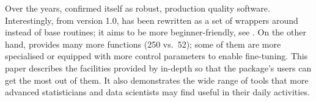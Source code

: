 \documentclass[nojss]{jss}
\begin{document}
Over the years, 
confirmed itself as robust,  production quality software.
Interestingly, from version 1.0,  has been rewritten as a
set of wrappers around  instead of base  routines;
it aims to be more beginner-friendly,
see \cite[Chapter~14]{GrolemundWickham2017:rdatascience}.
On the other hand,  provides many more
functions (250
vs.~52); some of them are
more specialised or equipped with more control parameters
to enable fine-tuning.
This paper describes the facilities
provided by  in-depth so that the package's users
can get the most out of them. It also demonstrates the wide range
of tools that more advanced statisticians and data scientists may find
useful in their daily activities.














%
%
%
%
%
%





%
%
\end{document}
